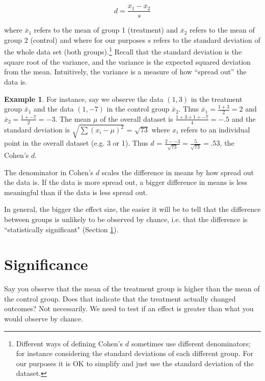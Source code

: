 \documentclass[]{article}
\theoremstyle{definition}
\newtheorem{exmp}{Example}[section]
\begin{document}
\begin{equation}
d=\frac{\overline{x}_1 - \overline{x}_2}{s}
\end{equation}

\noindent where $\overline{x}_1$ refers to the mean of group 1 (treatment) and $\overline{x}_2$ refers to the mean of group 2 (control) and where for our purposes $s$ refers to the standard deviation of the whole data set (both groups).\footnote{Different ways of defining Cohen's $d$ sometimes use different denominators; for instance considering the standard deviations of each different group. For our purposes it is OK to simplify and just use the standard deviation of the dataset.} Recall that the standard deviation is the square root of the variance, and the variance is the expected squared deviation from the mean. Intuitively, the variance is a measure of how ``spread out'' the data is.

\begin{exmp}
For instance, say we observe the data $(1,3)$ in the treatment group $\bar{x}_1$ and the data $(1,-7)$ in the control group $\bar{x}_2$. Thus $\overline{x}_1 = \frac{1+3}{2} = 2$ and $\overline{x}_2 = \frac{1+-7}{2} = -3$. The mean $\mu$ of the overall dataset is $\frac{1+3+1+-7}{4}=-.5$ and the standard deviation is $\sqrt{\sum (x_i - \mu)^2}$ = $\sqrt{73}$ where $x_i$ refers to an individual point in the overall dataset (e.g. 3 or 1). Thus $d$ = $\frac{2 -- 3}{\sqrt{73}} = \frac{5}{\sqrt{73}}=.53$, the Cohen's $d$.
\end{exmp}

\noindent The denominator in Cohen's $d$ scales the difference in means by how spread out the data is. If the data is more spread out, a bigger difference in means is less meaningful than if the data is less spread out.

In general, the bigger the effect size, the easier it will be to tell that the difference between groups is unlikely to be observed by chance, i.e. that the difference is ``statistically significant" (Section \ref{s:significance}).

\section{Significance}\label{s:significance}
Say you observe that the mean of the treatment group is higher than the mean of the control group. Does that indicate that the treatment actually changed outcomes? Not necessarily. We need to test if an effect is greater than what you would observe by chance.
\end{document}
